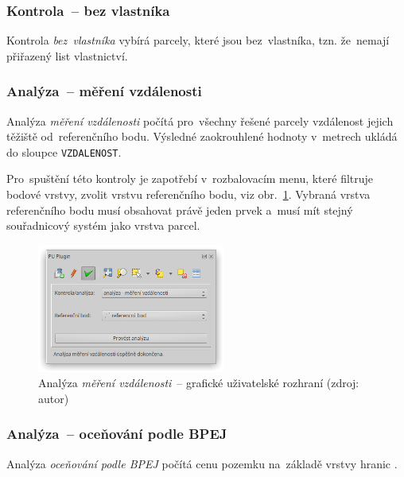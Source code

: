\subsubsection{Kontrola~– bez vlastníka}
\label{manual_kontrola_bez_vlastnika}

Kontrola \textit{bez~vlastníka} vybírá parcely, které jsou
bez~vlastníka, tzn. že~nemají přiřazený list vlastnictví.

\subsubsection{Analýza~– měření vzdálenosti}
\label{manual_analyza_vzdalenosti}

Analýza \textit{měření vzdálenosti} počítá pro~všechny řešené parcely
vzdálenost jejich těžiště od~referenčního bodu. Výsledné zaokrouhlené
hodnoty v~metrech ukládá do sloupce \texttt{VZDALENOST}.

Pro~spuštění této kontroly je zapotřebí v~rozbalovacím menu, které
filtruje bodové vrstvy, zvolit vrstvu referenčního bodu, viz
obr.~\ref{fig:manual_analyza_vzdalenosti_gui}. Vybraná vrstva
referenčního bodu musí obsahovat právě jeden prvek a~musí mít stejný
souřadnicový systém jako vrstva parcel.

	\begin{figure}[H] \centering
		\includegraphics[width=0.55\textwidth]{./pictures/analyza_vzdalenost.png}
		\caption[Analýza \textit{měření vzdálenosti}~–
grafické uživatelské rozhraní]{Analýza \textit{měření vzdálenosti}~–
grafické uživatelské rozhraní (zdroj: autor)}
		\label{fig:manual_analyza_vzdalenosti_gui}
 	\end{figure}

\subsubsection{Analýza~– oceňování podle BPEJ}
\label{manual_analyza_bpej}

Analýza \textit{oceňování podle BPEJ} počítá cenu pozemku na~základě
vrstvy hranic .

